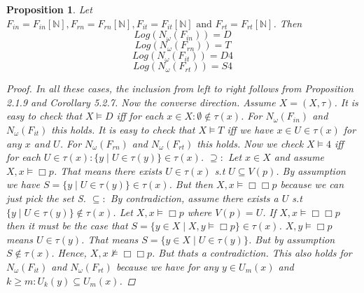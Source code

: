 \documentclass[12pt, a4paper]{scrartcl}
\newtheorem{proposition}[definition]{Proposition}
\begin{document}
\begin{proposition}
    Let $F_{in} = F_{in}[\mathbb{N}], F_{rn} = F_{rn}[\mathbb{N}], F_{it} = F_{it}[\mathbb{N}] \mbox{ and } F_{rt} = F_{rt}[\mathbb{N}]$. Then
    $$Log(N_\omega(F_{in})) = D$$
    $$Log(N_\omega(F_{rn})) = T$$
    $$Log(N_\omega(F_{it})) = D4$$
    $$Log(N_\omega(F_{rt})) = S4$$

    \begin{proof}
        In all these cases, the inclusion from left to right follows from Proposition 2.1.9 and Corollary 5.2.7.
        Now the converse direction. Assume $X =(X,\tau)$. \newline
        It is easy to check that $X \vDash D$ iff for each $x \in X : \emptyset \notin \tau(x)$. For $N_\omega(F_{in})$ and $N_\omega(F_{it})$ this holds. \newline
        It is easy to check that $X \vDash T$ iff we have $x\in U \in \tau(x)$ for any $x$ and $U$. For $N_\omega(F_{rn})$ and $N_\omega(F_{rt})$ this holds. \newline
        Now we check $X \vDash 4$ iff for each $U \in \tau(x) : \{y \mid U \in \tau(y)\} \in \tau(x)$. \newline
        $\supseteq : $ Let $x \in X$ and assume $X,x \vDash \Box p$. That means there exists $U \in \tau(x)$ s.t $U\subseteq V(p)$.
        By assumption we have $S = \{y \mid U \in \tau(y)\} \in \tau(x)$. But then $X,x \vDash \Box\Box p$ because we can just pick the set S. \newline
        $\subseteq :$ By contradiction, assume there exists a $U$ s.t $\{y \mid U \in \tau(y)\} \notin \tau(x)$. Let $X,x \vDash \Box p$ where $V(p) = U$.
        If $X,x \vDash \Box\Box p$ then it must be the case that  \newline 
        $S =\{y \in X \mid X,y \vDash \Box p\} \in \tau(x)$. $X,y \vDash \Box p$ means $U \in \tau(y)$. That means $S = \{y \in X \mid U \in \tau(y)\}$. But by assumption $S \notin \tau(x)$. 
        Hence, $X,x \not\vDash \Box\Box p$. But thats a contradiction. This also holds for $N_\omega(F_{it})$ and $N_\omega(F_{rt})$ because we have for any $y \in U_m(x)$ and 
        $k \geq m : U_k(y) \subseteq U_m(x)$.
            
    \end{proof}
\end{proposition}
\end{document}
